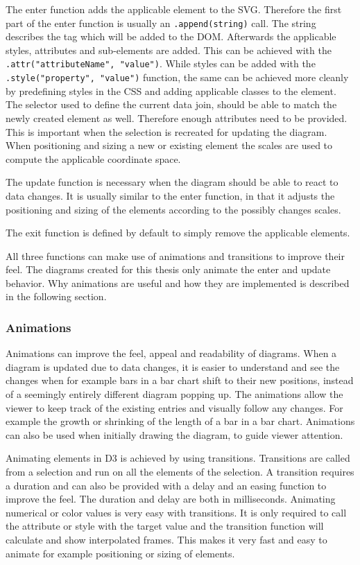 The enter function adds the applicable element to the SVG. Therefore the first part of the enter function is usually an \texttt{.append(string)} call. The string describes the tag which will be added to the DOM. Afterwards the applicable styles, attributes and sub-elements are added. This can be achieved with the \texttt{.attr("attributeName", "value")}. While styles can be added with the \texttt{.style("property", "value")} function, the same can be achieved more cleanly by predefining styles in the CSS and adding applicable classes to the element. The selector used to define the current data join, should be able to match the newly created element as well. Therefore enough attributes need to be provided. This is important when the selection is recreated for updating the diagram. When positioning and sizing a new or existing element the scales are used to compute the applicable coordinate space.

The update function is necessary when the diagram should be able to react to data changes. It is usually similar to the enter function, in that it adjusts the positioning and sizing of the elements according to the possibly changes scales. 

The exit function is defined by default to simply remove the applicable elements.

All three functions can make use of animations and transitions to improve their feel. The diagrams created for this thesis only animate the enter and update behavior. Why animations are useful and how they are implemented is described in the following section.

\subsubsection{Animations}

Animations can improve the feel, appeal and readability of diagrams. When a diagram is updated due to data changes, it is easier to understand and see the changes when for example bars in a bar chart shift to their new positions, instead of a seemingly entirely different diagram popping up. The animations allow the viewer to keep track of the existing entries and visually follow any changes. For example the growth or shrinking of the length of a bar in a bar chart. Animations can also be used when initially drawing the diagram, to guide viewer attention.

Animating elements in D3 is achieved by using transitions. Transitions are called from a selection and run on all the elements of the selection. A transition requires a duration and can also be provided with a delay and an easing function to improve the feel. The duration and delay are both in milliseconds. Animating numerical or color values is very easy with transitions. It is only required to call the attribute or style with the target value and the transition function will calculate and show interpolated frames. This makes it very fast and easy to animate for example positioning or sizing of elements.

